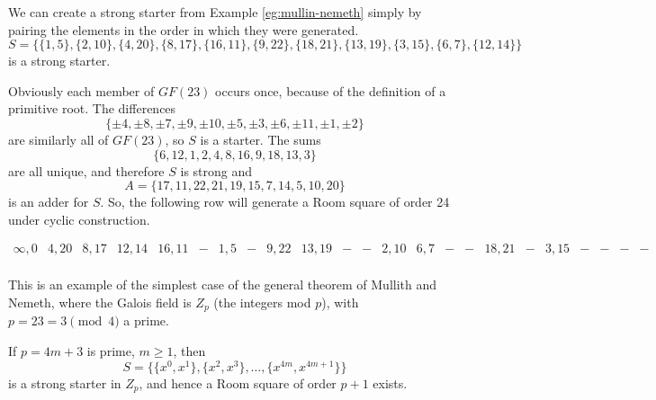 \begin{example}
\label{ex:strong-starter}
We can create a strong starter from Example \ref{eg:mullin-nemeth} simply by pairing the elements in the order in which they were generated.
\begin{equation}
S = \{\{1, 5\}, \{2, 10\}, \{4, 20\}, \{8, 17\}, \{16, 11\}, \{9, 22\}, \{18, 21\}, \{13, 19\}, \{3, 15\}, \{6, 7\}, \{12, 14\}\}
\end{equation}
is a strong starter.

Obviously each member of $GF(23)$ occurs once, because of the definition of a primitive root.
The differences
\begin{equation}
  \{\pm 4, \pm 8, \pm 7, \pm 9, \pm 10, \pm 5, \pm 3, \pm 6, \pm 11, \pm 1, \pm 2\}
\end{equation}
are similarly all of $GF(23)$, so $S$ is a starter.
The sums
\begin{equation}
  \{6, 12, 1, 2, 4, 8, 16, 9, 18, 13, 3\}
\end{equation}
are all unique, and therefore $S$ is strong and
\begin{equation}
  A = \{17, 11, 22, 21, 19, 15, 7, 14, 5, 10, 20\}
\end{equation}
is an adder for $S$.
So, the following row will generate a Room square of order 24 under cyclic construction.

\begin{equation}
  \begin{smallmatrix}
    \infty, 0 & 4,20 & 8,17 & 12,14 & 16,11 & - & 1,5 & - & 9,22 & 13,19 & - & - & 2,10 & 6,7 & - & - & 18,21 & - & 3,15 & - & - & - & - \\
  \end{smallmatrix}
\end{equation}

\end{example}

This is an example of the simplest case of the general theorem of Mullith and Nemeth, where the Galois field is $Z_p$ (the integers mod $p$), with $p = 23 = 3\pmod 4$ a prime.

\begin{theorem}
\label{thm:strong-starter}
If $p = 4m + 3$ is prime, $m \geq 1$, then
\begin{equation}
S = \{\{x^0, x^1\}, \{x^2, x^3\}, \ldots, \{x^{4m}, x^{4m+1}\}\}
\end{equation}
is a strong starter in $Z_p$, and hence a Room square of order $p + 1$ exists.
\end{theorem}

